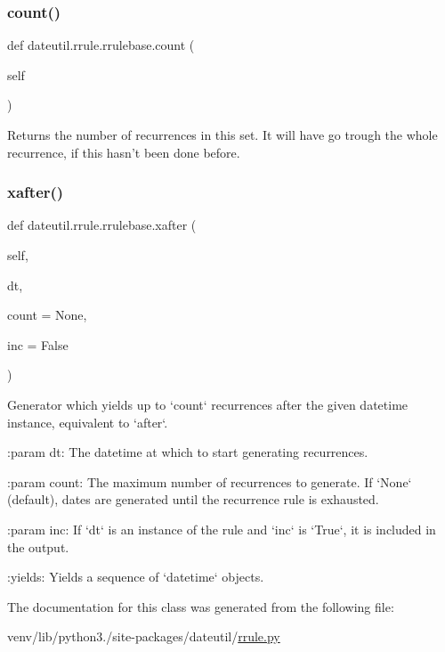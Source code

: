 \subsubsection{\texorpdfstring{count()}{count()}}
{\footnotesize\ttfamily def dateutil.\+rrule.\+rrulebase.\+count (\begin{DoxyParamCaption}\item[{}]{self }\end{DoxyParamCaption})}

\begin{DoxyVerb}Returns the number of recurrences in this set. It will have go
    trough the whole recurrence, if this hasn't been done before. \end{DoxyVerb}
 \mbox{\label{classdateutil_1_1rrule_1_1rrulebase_ae755a3d4f64406c6b07c848f9b88e2ef}} 
\subsubsection{\texorpdfstring{xafter()}{xafter()}}
{\footnotesize\ttfamily def dateutil.\+rrule.\+rrulebase.\+xafter (\begin{DoxyParamCaption}\item[{}]{self,  }\item[{}]{dt,  }\item[{}]{count = {\ttfamily None},  }\item[{}]{inc = {\ttfamily False} }\end{DoxyParamCaption})}

\begin{DoxyVerb}Generator which yields up to `count` recurrences after the given
datetime instance, equivalent to `after`.

:param dt:
    The datetime at which to start generating recurrences.

:param count:
    The maximum number of recurrences to generate. If `None` (default),
    dates are generated until the recurrence rule is exhausted.

:param inc:
    If `dt` is an instance of the rule and `inc` is `True`, it is
    included in the output.

:yields: Yields a sequence of `datetime` objects.
\end{DoxyVerb}
 

The documentation for this class was generated from the following file\+:\begin{DoxyCompactItemize}
\item 
venv/lib/python3./site-\/packages/dateutil/\hyperlink{rrule_8py}{rrule.\+py}\end{DoxyCompactItemize}

